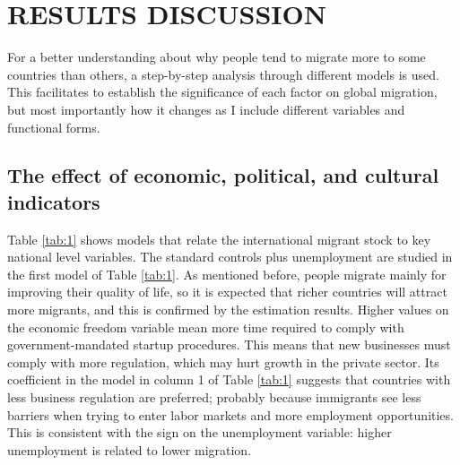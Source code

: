 \documentclass[../main.tex]{subfiles}
\begin{document}
\section{RESULTS DISCUSSION}
 For a better understanding about why people tend to migrate more to some countries than others, a step-by-step analysis through different models is used. This facilitates to establish the significance of each factor on global migration, but most importantly how it changes as I include different variables and functional forms.
\subsection{The effect of economic, political, and cultural indicators}
Table \ref{tab:1} shows models that relate the international migrant stock to key national level variables. The standard controls plus unemployment are studied in the first model of Table \ref{tab:1}. As mentioned before, people migrate mainly for improving their quality of life, so it is expected that richer countries will attract more migrants, and this is confirmed by the estimation results. Higher values on the economic freedom variable mean more time required to comply with government-mandated startup procedures. This means that new businesses must comply with more regulation, which may hurt growth in the private sector. Its coefficient in the model in column 1 of Table \ref{tab:1} suggests that countries with less business regulation are preferred; probably because immigrants see less barriers when trying to enter labor markets and more employment opportunities. This is consistent with the sign on the unemployment variable: higher unemployment is related to lower migration. 
 
\end{document}
